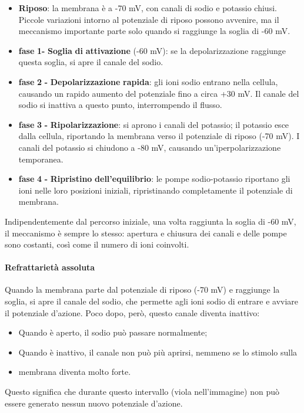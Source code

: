 \documentclass[12pt,a4paper]{book}
\begin{document}
\begin{itemize}
  \item \textbf{Riposo}: la membrana è a -70 mV, con canali di sodio e potassio chiusi. Piccole variazioni intorno al potenziale di riposo possono avvenire, ma il meccanismo importante parte solo quando si raggiunge la soglia di -60 mV.
  \item \textbf{fase}\textbf{ }\textbf{1-}\textbf{ }\textbf{Soglia}\textbf{ }\textbf{di}\textbf{ }\textbf{attivazione}\textbf{ }(-60 mV): se la depolarizzazione raggiunge questa soglia, si apre il canale del sodio.
  \item \textbf{fase}\textbf{ }\textbf{2}\textbf{ }\textbf{-}\textbf{ }\textbf{Depolarizzazione}\textbf{ }\textbf{rapida}: gli ioni sodio entrano nella cellula, causando un rapido aumento del potenziale fino a circa +30 mV. Il canale del sodio si inattiva a questo punto, interrompendo il flusso.
  \item \textbf{fase}\textbf{ }\textbf{3}\textbf{ }\textbf{-}\textbf{ }\textbf{Ripolarizzazione}: si aprono i canali del potassio; il potassio esce dalla cellula, riportando la membrana verso il potenziale di riposo (-70 mV). I canali del potassio si chiudono a -80 mV, causando un'iperpolarizzazione temporanea.
  \item \textbf{fase}\textbf{ }\textbf{4}\textbf{ }\textbf{-}\textbf{ }\textbf{Ripristino}\textbf{ }\textbf{dell'equilibrio}: le pompe sodio-potassio riportano gli ioni nelle loro posizioni iniziali, ripristinando completamente il potenziale di membrana.
\end{itemize}
Indipendentemente dal percorso iniziale, una volta raggiunta la soglia di -60 mV, il meccanismo è sempre lo stesso: apertura e chiusura dei canali e delle pompe sono costanti, così come il numero di ioni coinvolti.


\paragraph{Refrattarietà assoluta}

Quando la membrana parte dal potenziale di riposo (-70 mV) e raggiunge la soglia, si apre il canale del sodio, che permette agli ioni sodio di entrare e avviare il potenziale d'azione. Poco dopo, però, questo canale diventa inattivo:

\begin{itemize}
  \item Quando è aperto, il sodio può passare normalmente;
  \item Quando è inattivo, il canale non può più aprirsi, nemmeno se lo stimolo sulla
  \item membrana diventa molto forte.
\end{itemize}
Questo significa che durante questo intervallo (viola nell'immagine) non può essere generato nessun nuovo potenziale d'azione.
\end{document}
